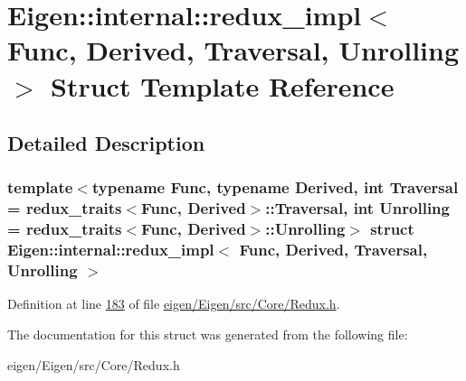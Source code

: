 \hypertarget{struct_eigen_1_1internal_1_1redux__impl}{}\section{Eigen\+:\+:internal\+:\+:redux\+\_\+impl$<$ Func, Derived, Traversal, Unrolling $>$ Struct Template Reference}
\label{struct_eigen_1_1internal_1_1redux__impl}


\subsection{Detailed Description}
\subsubsection*{template$<$typename Func, typename Derived, int Traversal = redux\+\_\+traits$<$\+Func, Derived$>$\+::\+Traversal, int Unrolling = redux\+\_\+traits$<$\+Func, Derived$>$\+::\+Unrolling$>$\newline
struct Eigen\+::internal\+::redux\+\_\+impl$<$ Func, Derived, Traversal, Unrolling $>$}



Definition at line \hyperlink{eigen_2_eigen_2src_2_core_2_redux_8h_source_l00183}{183} of file \hyperlink{eigen_2_eigen_2src_2_core_2_redux_8h_source}{eigen/\+Eigen/src/\+Core/\+Redux.\+h}.



The documentation for this struct was generated from the following file\+:\begin{DoxyCompactItemize}
\item 
eigen/\+Eigen/src/\+Core/\+Redux.\+h\end{DoxyCompactItemize}
